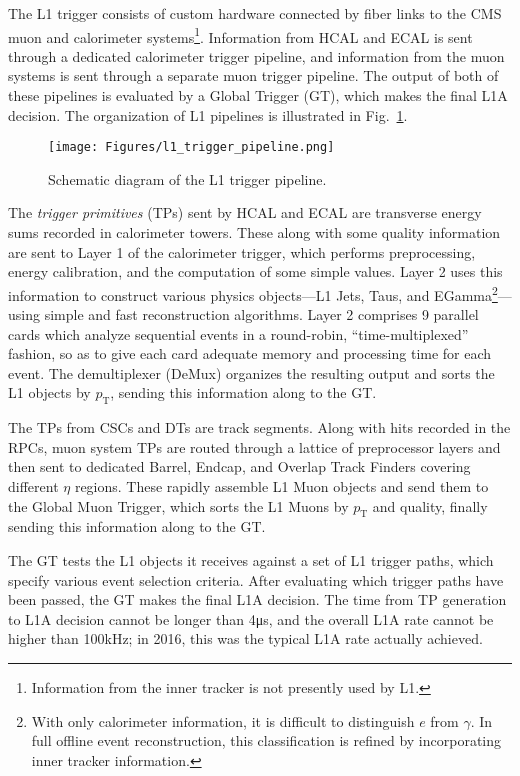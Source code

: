 The L1 trigger consists of custom hardware connected by fiber links to the CMS muon and calorimeter systems\footnote{Information
from the inner tracker is not presently used by L1.}. Information from HCAL and ECAL is
sent through a dedicated calorimeter trigger pipeline, and information from the muon systems is sent through a separate muon trigger pipeline.
The output of both of these pipelines is evaluated by a Global Trigger (GT), which makes
the final L1A decision. The organization of L1 pipelines is illustrated in Fig.~\ref{fig:l1_trigger_pipeline}.

\begin{figure}[hbtp]
  \begin{center}
    \texttt{[image: Figures/l1\_trigger\_pipeline.png]}
    \caption{
    Schematic diagram of the L1 trigger pipeline.
    }
    \label{fig:l1_trigger_pipeline}
  \end{center}
\end{figure}

The \textit{trigger primitives} (TPs) sent by HCAL and ECAL are transverse energy sums recorded in calorimeter towers.
These along with some quality information are sent to Layer 1 of the calorimeter trigger,
which performs preprocessing, energy calibration, and the computation of some simple values. Layer 2 uses this information to construct
various physics objects---L1 Jets, Taus, and EGamma\footnote{With only calorimeter information, it is difficult to distinguish $e$ from $\gamma$.
In full offline event reconstruction, this classification is refined by incorporating inner tracker information.}---using simple and fast reconstruction algorithms.
Layer 2 comprises 9 parallel cards which analyze sequential events in a round-robin, ``time-multiplexed'' fashion, so as to give
each card adequate memory and processing time for each event. The demultiplexer (DeMux) organizes the resulting output and sorts the L1 objects by $p_\mathrm{T}$,
sending this information along to the GT.

The TPs from CSCs and DTs are track segments. Along with hits recorded in the RPCs, muon system TPs are routed through a lattice of preprocessor
layers and then sent to dedicated Barrel, Endcap, and Overlap Track Finders covering different $\eta$ regions.
These rapidly assemble L1 Muon objects and send them to the Global Muon Trigger,
which sorts the L1 Muons by $p_\mathrm{T}$ and quality, finally sending this information along to the GT.

The GT tests the L1 objects it receives against a set of L1 trigger paths, which specify various event selection criteria. After evaluating
which trigger paths have been passed, the GT makes the final L1A decision. The time from TP generation to L1A decision cannot be longer than
4\unit{\micro s}, and the overall L1A rate cannot be higher than 100\unit{kHz}; in 2016, this was the typical L1A rate actually achieved.

